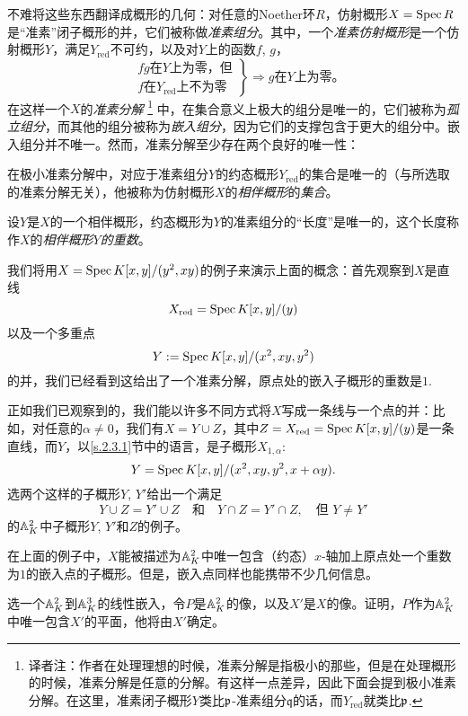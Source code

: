 不难将这些东西翻译成概形的几何：对任意的Noether环$R$，仿射概形$X=\operatorname{Spec} R$是“准素”闭子概形的并，它们被称做\textit{准素组分}。其中，一个\textit{准素仿射概形}是一个仿射概形$Y$，满足$Y_{\text{red}}$不可约，以及对$Y$上的函数$f$, $g$，
\[
	\left. 
		\begin{aligned}
			&\text{$fg$在$Y$上为零，但}\\
			&\text{$f$在$Y_{\text{red}}$上不为零}
		\end{aligned}
	\right\} \Rightarrow \text{$g$在$Y$上为零。}
\]
在这样一个$X$的\textit{准素分解}
\footnote{译者注：作者在处理理想的时候，准素分解是指极小的那些，但是在处理概形的时候，准素分解是任意的分解。有这样一点差异，因此下面会提到极小准素分解。在这里，准素闭子概形$Y$类比$\mathfrak{p}$-准素组分$\mathfrak{q}$的话，而$Y_{\text{red}}$就类比$\mathfrak{p}$.}
中，在集合意义上极大的组分是唯一的，它们被称为\textit{孤立组分}，而其他的组分被称为\textit{嵌入组分}，因为它们的支撑包含于更大的组分中。嵌入组分并不唯一。然而，准素分解至少存在两个良好的唯一性：
\begin{compactenum}[(1)]
\item 在极小准素分解中，对应于准素组分$Y$的约态概形$Y_{\text{red}}$的集合是唯一的（与所选取的准素分解无关），他被称为仿射概形$X$的\textit{相伴概形}的\textit{集合}。
\item 设$Y$是$X$的一个相伴概形，约态概形为$Y$的准素组分的“长度”是唯一的，这个长度称作$X$的\textit{相伴概形$Y$的重数}。
\end{compactenum}

我们将用$X=\operatorname{Spec} K[x,y]/(y^2,xy)$的例子来演示上面的概念：首先观察到$X$是直线
\[
	X_{\text{red}}=\operatorname{Spec} K[x,y]/(y)
\]
以及一个多重点
\[
	Y:=\operatorname{Spec} K[x,y]/(x^2,xy,y^2)
\]
的并，我们已经看到这给出了一个准素分解，原点处的嵌入子概形的重数是$1$.

正如我们已观察到的，我们能以许多不同方式将$X$写成一条线与一个点的并：比如，对任意的$\alpha\neq 0$，我们有$X=Y\cup Z$，其中$Z=X_{\text{red}}=\operatorname{Spec} K[x,y]/(y)$是一条直线，而$Y$，以\ref{s.2.3.1}节中的语言，是子概形$X_{1,\alpha}$:
\[
	Y=\operatorname{Spec} K[x,y]/(x^2,xy,y^2,x+\alpha y).
\]
选两个这样的子概形$Y$, $Y'$给出一个满足
\[
	Y\cup Z=Y'\cup Z\quad \text{和}\quad Y\cap Z=Y'\cap Z,\quad \text{但}\,\,Y\neq Y'
\]
的$\mathbb{A}_K^2$中子概形$Y$, $Y'$和$Z$的例子。

在上面的例子中，$X$能被描述为$\mathbb{A}_K^2$中唯一包含（约态）$x$-轴加上原点处一个重数为$1$的嵌入点的子概形。但是，嵌入点同样也能携带不少几何信息。

\begin{exe}
	选一个$\mathbb{A}_K^2$到$\mathbb{A}^3_K$的线性嵌入，令$P$是$\mathbb{A}_K^2$的像，以及$X'$是$X$的像。证明，$P$作为$\mathbb{A}_K^2$中唯一包含$X'$的平面，他将由$X'$确定。
\end{exe}

